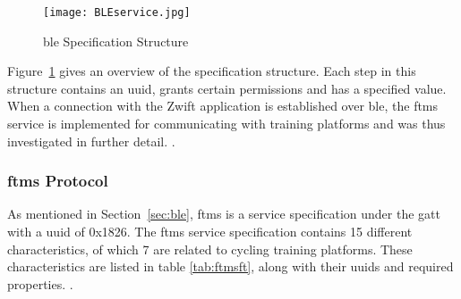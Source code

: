 \begin{figure}[H]
	\begin{center}
		\texttt{[image: BLEservice.jpg]}
		\caption{\ac{ble} Specification Structure}
		\label{fig:serv}
		\citep[Adapted from][]{Townsend:2014}
	\end{center}
\end{figure}

Figure~\ref{fig:serv} gives an overview of the specification structure. Each step in this structure contains an \ac{uuid}, grants certain permissions and has a specified value. When a connection with the Zwift application is established over \ac{ble}, the \ac{ftms} service is implemented for communicating with training platforms and was thus investigated in further detail. \cite[2017]{BLSIG:2017}.

\subsubsection{\acf{ftms} Protocol}\label{sec:ftms}

As mentioned in Section~\ref{sec:ble}, \acf{ftms} is a service specification under the \acf{gatt} with a \ac{uuid} of 0x1826. The \ac{ftms} service specification contains 15 different characteristics, of which 7 are related to cycling training platforms. These characteristics are listed in table \ref{tab:ftmsft}, along with their \acp{uuid} and required properties. \cite[2017]{BLSIG:2017}.


